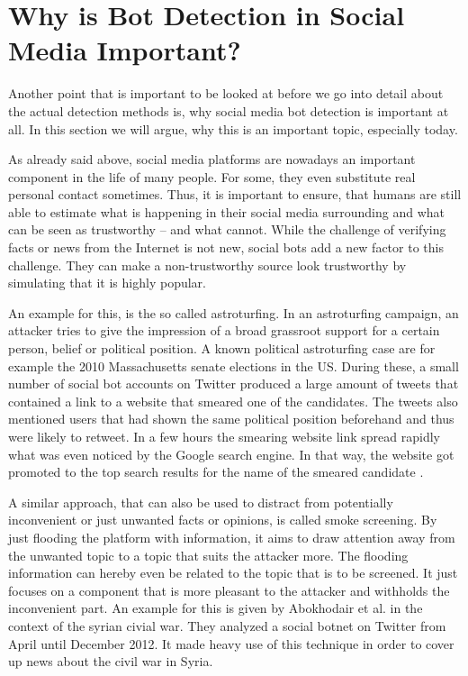 \section{Why is Bot Detection in Social Media Important?}
Another point that is important to be looked at before we go into detail about the actual detection methods is, why social media bot detection is important at all. In this section we will argue, why this is an important topic, especially today. 

As already said above, social media platforms are nowadays an important component in the life of many people. For some, they even substitute real personal contact sometimes. Thus, it is important to ensure, that humans are still able to estimate what is happening in their social media surrounding and what can be seen as trustworthy -- and what cannot. While the challenge of verifying facts or news from the Internet is not new, social bots add a new factor to this challenge. They can make a non-trustworthy source look trustworthy by simulating that it is highly popular.

An example for this, is the so called astroturfing. In an astroturfing campaign, an attacker tries to give the impression of a broad grassroot support for a certain person, belief or political position. A known political astroturfing case are for example the 2010 Massachusetts senate elections in the US. During these, a small number of social bot accounts on Twitter produced a large amount of tweets that contained a link to a website that smeared one of the candidates. The tweets also mentioned users that had shown the same political position beforehand and thus were likely to retweet. In a few hours the smearing website link spread rapidly what was even noticed by the Google search engine. In that way, the website got promoted to the top search results for the name of the smeared candidate \cite{mustafaraj10}. 

A similar approach, that can also be used to distract from potentially inconvenient or just unwanted facts or opinions, is called smoke screening. By just flooding the platform with information, it aims to draw attention away from the unwanted topic to a topic that suits the attacker more. The flooding information can hereby even be related to the topic that is to be screened. It just focuses on a component that is more pleasant to the attacker and withholds the inconvenient part. An example for this is given by Abokhodair et al. \cite{abokhodair} in the context of the syrian civial war. They analyzed a social botnet on Twitter from April until December 2012. It made heavy use of this technique in order to cover up news about the civil war in Syria.

